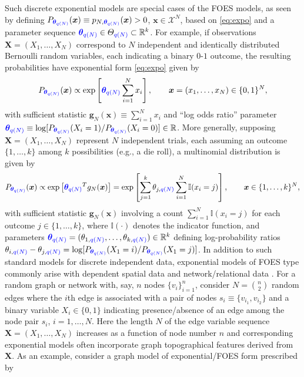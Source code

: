 \documentclass[numbib]{imamat}
\theoremstyle{theorem}
\theoremstyle{lemma}
\theoremstyle{example}
\theoremstyle{corollary}
\theoremstyle{definition}
\theoremstyle{remark}
\theoremstyle{approximation}
\theoremstyle{scheme}
\newcommand{\thetaidx}{q(N)}
\newcommand{\thetaN}{\boldsymbol \theta_{\thetaidx}}
\newcommand{\ak}[1]{{\color{blue} #1}}
\begin{document}
Such discrete \ak{exponential models} are special cases of the FOES models, as seen by defining \(P_{\ak{\thetaN}}(\boldsymbol x)\equiv p_{N, \ak{\thetaN}}(\boldsymbol x)> 0\), \(\boldsymbol x \in \mathcal{X}^N\), based on \eqref{eq:expo} and a parameter sequence \(\ak{\thetaN} \in \Theta_{\ak{\thetaidx}} \subset \mathbb{R}^k\). For example, if observations \(\boldsymbol X = (X_1,\ldots,X_N)\) correspond to \(N\) independent and identically distributed Bernoulli random variables, each indicating a binary \(0\)-\(1\) outcome, the resulting probabilities have exponential form \eqref{eq:expo} given by
\begin{equation}
\label{eq:mod1}
P_{\ak{\thetaN}}(\boldsymbol x) \propto
 \exp\left[\ak{\thetaN} \sum_{i=1}^N x_i\right], \qquad \boldsymbol x=(x_1,\ldots,x_N) \in\{0,1\}^N, 
 \end{equation}
with sufficient statistic \(\boldsymbol g_N(\boldsymbol x)\equiv \sum_{i=1}^N x_i\) and ``log odds ratio'' parameter \(\ak{\thetaN} \equiv \log[ P_{\ak{\thetaN}}(X_i=1)/P_{\ak{\thetaN}}(X_i=0) ] \in \mathbb{R}\). More generally, supposing \(\boldsymbol X =(X_1,\ldots,X_N)\) represent \(N\) independent trials, each assuming an outcome \(\{1,\ldots,k\}\) among \(k\) possibilities (e.g., a die roll), a multinomial distribution is given by
\begin{equation}
\label{eq:mod11}
P_{\ak{\thetaN}}(\boldsymbol x) \propto  \exp\left[  \ak{\thetaN}^T g_N(\boldsymbol x)   \right] =
\exp\left[ \sum_{j=1}^k {\theta_{j,\ak{\thetaidx}}} \sum_{i=1}^N \mathbb{I}(x_i=j) \right], \qquad \boldsymbol x  \in\{1,\ldots,k\}^N, 
\end{equation}
with sufficient statistic \(\boldsymbol g_N(\boldsymbol x)\) involving a count \(\sum_{i=1}^N \mathbb{I}(x_i=j)\) for each outcome \(j \in \{1,\ldots,k\}\), where \(\mathbb{I}(\cdot)\) denotes the indicator function, and parameters \(\ak{\thetaN}=(\theta_{1,\ak{\thetaidx}},\ldots,\theta_{k,\ak{\thetaidx}})\in\mathbb{R}^k\) defining log-probability ratios \(\theta_{i,\ak{\thetaidx}}-\theta_{j,\ak{\thetaidx}} =\log [P_{\ak{\thetaN}}(X_1=i)/P_{\ak{\thetaN}}(X_1=j)]\). In addition to such standard models for discrete independent data, exponential models of FOES type commonly arise with dependent spatial data \citep{besag1974spatial} and network/relational data \citep{wasserman1994social, handcock2003assessing}. For a random graph or network with, say, \(n\) nodes \ak{$\{v_i\}_{i = 1}^n$}, consider \(N={n \choose 2}\) random edges where the \(i\)th edge is associated with a pair of nodes \(s_i \equiv \{v_{i_1},v_{i_2}\}\) and a binary variable \(X_i\in\{0,1\}\) indicating presence/absence of an edge among the node pair \(s_i\), \(i=1,\ldots,N\). Here the length \(N\) of the edge variable sequence \(\boldsymbol X = (X_1,\ldots,X_N)\) increases as a function of node number \(n\) and corresponding exponential models often incorporate graph topographical features derived from \(\boldsymbol X\). As an example, consider a graph model of exponential/FOES form prescribed by
\end{document}
